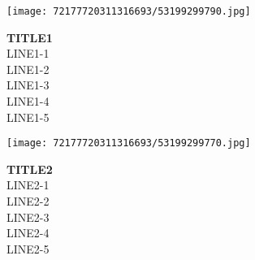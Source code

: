 \documentclass[10pt,letterpaper]{article}
\title{}
\author{}
\date{}
\begin{document}
\begin{center}\texttt{[image: 72177720311316693/53199299790.jpg]}
\end{center}
\begin{center}
\textbf{TITLE1}\\
\vskip 0.2in
LINE1-1\\
LINE1-2\\
LINE1-3\\
LINE1-4\\
LINE1-5\\
\end{center}
\pagebreak

\begin{center}
\texttt{[image: 72177720311316693/53199299770.jpg]}
\end{center}

\begin{center}
\textbf{TITLE2}\\
\vskip 0.2in
LINE2-1\\
LINE2-2\\
LINE2-3\\
LINE2-4\\
LINE2-5\\
\end{center}
\pagebreak
\end{document}

